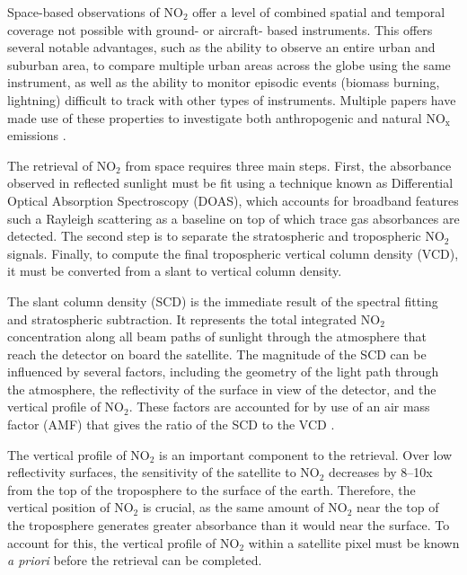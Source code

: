 \documentclass[a4paper,10pt,oneside]{article}
\newcommand{\ce}[1]{$\mathrm{#1}$}
\begin{document}
\begin{sloppy}
Space-based observations of \ce{NO_2} offer a level of combined spatial and temporal coverage not possible with ground- or aircraft- based instruments.  This offers several notable advantages, such as the ability to observe an entire urban and suburban area, to compare multiple urban areas across the globe using the same instrument, as well as the ability to monitor episodic events (biomass burning, lightning) difficult to track with other types of instruments.  Multiple papers have made use of these properties to investigate both anthropogenic \cite{ding15, lamsal15, tong15, huang14, vinken14, gu13, miyazaki12, russell12, lin10, kim09} and natural \ce{NO_x} emissions \cite{miyazaki14, beirle10, castellanos14, mebust14, mebust13, zorner16}.

The retrieval of \ce{NO_2} from space requires three main steps. First, the absorbance observed in reflected sunlight must be fit using a technique known as Differential Optical Absorption Spectroscopy (DOAS), which accounts for broadband features such a Rayleigh scattering as a baseline on top of which trace gas absorbances are detected. The second step is to separate the stratospheric and tropospheric \ce{NO_2} signals. Finally, to compute the final tropospheric vertical column density (VCD), it must be converted from a slant to vertical column density.

The slant column density (SCD) is the immediate result of the spectral fitting and stratospheric subtraction. It represents the total integrated \ce{NO_2} concentration along all beam paths of sunlight through the atmosphere that reach the detector on board the satellite.  The magnitude of the SCD can be influenced by several factors, including the geometry of the light path through the atmosphere, the reflectivity of the surface in view of the detector, and the vertical profile of \ce{NO_2}. These factors are accounted for by use of an air mass factor (AMF) that gives the ratio of the SCD to the VCD \cite{palmer01}. 

The vertical profile of \ce{NO_2} is an important component to the retrieval. Over low reflectivity surfaces, the sensitivity of the satellite to \ce{NO_2} decreases by 8--10x from the top of the troposphere to the surface of the earth.  Therefore, the vertical position of \ce{NO_2} is crucial, as the same amount of \ce{NO_2} near the top of the troposphere generates greater absorbance than it would near the surface. To account for this, the vertical profile of \ce{NO_2} within a satellite pixel must be known \emph{a priori} before the retrieval can be completed.


\end{sloppy}
\end{document}
